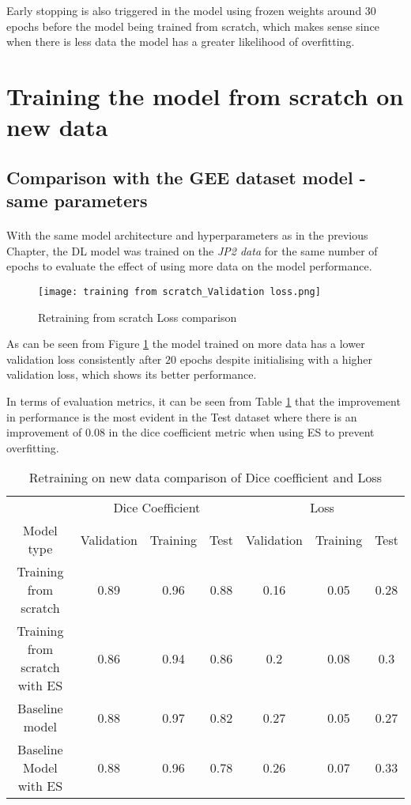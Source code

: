 Early stopping is also triggered in the model using frozen weights around $30$ epochs before the model being trained from scratch, which makes sense since when there is less data the model has a greater likelihood of overfitting.

\section{Training the model from scratch on new data} \label{new_data_fs}
\subsection{Comparison with the \gls{GEE} dataset model - same parameters}
\paragraph{}
With the same model architecture and hyperparameters as in the previous Chapter, the \gls{DL} model was trained on the \textit{JP2 data} for the same number of epochs to evaluate the effect of using more data on the model performance.

\begin{figure}[hbt!]
    \centering
    \texttt{[image: training from scratch\_Validation loss.png]}
    \caption{Retraining from scratch Loss comparison}
    \label{fs_loss}
\end{figure}
As can be seen from Figure \ref{fs_loss} the model trained on more data has a lower validation loss consistently after $20$ epochs despite initialising with a higher validation loss, which shows its better performance. 

In terms of evaluation metrics, it can be seen from Table \ref{tab_fs} that the improvement in performance is the most evident in the Test dataset where there is an improvement of $0.08$ in the dice coefficient metric when using \gls{ES} to prevent overfitting.

\begin{table}[ht] 
    \begin{center}
    \begin{tabular}{ccccccc} 
    \toprule
       & \multicolumn{3}{c}{Dice Coefficient}     & \multicolumn{3}{c}{Loss} \\
    Model type & Validation & Training & Test & Validation    & Training    & Test   \\ \midrule
    \rowcolor{lightgray}
    Training from scratch & 0.89 & 0.96 & 0.88 & 0.16 & 0.05 & 0.28  \\ Training from scratch with ES & 0.86 & 0.94 & 0.86 & 0.2 & 0.08 & 0.3  \\ Baseline model & 0.88 & 0.97 & 0.82 & 0.27 & 0.05 & 0.27  \\ Baseline Model with ES & 0.88 & 0.96 & 0.78 & 0.26 & 0.07 & 0.33  \\
    \bottomrule
    \end{tabular}
  \end{center} 
  \caption{Retraining on new data comparison of Dice coefficient and Loss}\label{tab_fs}
\end{table}

